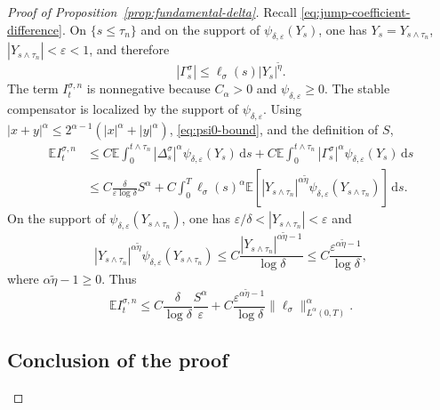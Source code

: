 \documentclass[11pt]{article}
\newcommand{\E}{\mathbb{E}}
\newcommand{\1}{\mathbf{1}}
\newcommand{\dd}{\,\mathrm{d}}
\newcommand{\wt}{\tilde}
\newcommand{\eps}{\varepsilon}
\begin{document}
\begin{proof}[Proof of Proposition~\ref{prop:fundamental-delta}]
Recall \eqref{eq:jump-coefficient-difference}. On $\{s\le\tau_n\}$ and on the support of $\psi_{\delta,\eps}(Y_s)$, one has $Y_s=Y_{s\wedge\tau_n}$, $|Y_{s\wedge\tau_n}|<\eps<1$, and therefore
\[
  |\Gamma_s^\sigma|\le \ell_\sigma(s)|Y_s|^{\wt\eta}.
\]
The term $I_t^{\sigma,n}$ is nonnegative because $C_\alpha>0$ and $\psi_{\delta,\eps}\ge0$. The stable compensator is localized by the support of $\psi_{\delta,\eps}$. Using $|x+y|^\alpha\le2^{\alpha-1}(|x|^\alpha+|y|^\alpha)$, \eqref{eq:psi0-bound}, and the definition of $S$,
\begin{align*}
\E I_t^{\sigma,n}
&\le C\E\int_0^{t\wedge\tau_n}|\Delta_s^\sigma|^\alpha\psi_{\delta,\eps}(Y_s)\dd s
+C\E\int_0^{t\wedge\tau_n}|\Gamma_s^\sigma|^\alpha\psi_{\delta,\eps}(Y_s)\dd s\\
&\le C\frac{\delta}{\eps\log\delta}S^\alpha
+C\int_0^T \ell_\sigma(s)^\alpha\E\left[|Y_{s\wedge\tau_n}|^{\alpha\wt\eta}\psi_{\delta,\eps}(Y_{s\wedge\tau_n})\right]\dd s.
\end{align*}
On the support of $\psi_{\delta,\eps}(Y_{s\wedge\tau_n})$, one has
$\eps/\delta<|Y_{s\wedge\tau_n}|<\eps$ and
\[
|Y_{s\wedge\tau_n}|^{\alpha\wt\eta}\psi_{\delta,\eps}(Y_{s\wedge\tau_n})
\le C\frac{|Y_{s\wedge\tau_n}|^{\alpha\wt\eta-1}}{\log\delta}
\le C\frac{\eps^{\alpha\wt\eta-1}}{\log\delta},
\]
where $\alpha\wt\eta-1\ge0$. Thus
\begin{equation}\label{eq:stable-estimate}
\E I_t^{\sigma,n}
\le C\frac{\delta}{\log\delta}\frac{S^\alpha}{\eps}
+C\frac{\eps^{\alpha\wt\eta-1}}{\log\delta}\|\ell_\sigma\|_{L^\alpha(0,T)}^\alpha.
\end{equation}

\subsection{Conclusion of the proof}
\label{subsec:proof-conclusion}


\end{proof}
\end{document}
